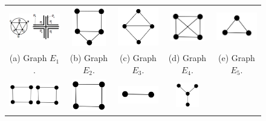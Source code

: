 \documentclass{dmgt}
\begin{document}
%
 \begin{figure}[htb]	
 
   \centering
  \begin{tabular}{  c c c c  c}
    \includegraphics[width=3cm]{octaedro.png} 
    & 
    \includegraphics[width=1.5cm]{ex3.png} 
    & 
    \includegraphics[width=2cm]{diamondNoLabel.png} 
    & 
    \includegraphics[width=1.5cm]{k4.png} 
    & 
    \includegraphics[width=2cm]{k3.png} 
    \\
    \footnotesize 
    (a)  \footnotesize Graph $E_1$. 
    & 
    \footnotesize (b) Graph $E_2$.
    & 
    \footnotesize (c) Graph $E_3$.
    & 
    \footnotesize (d) Graph $E_4$.
    & 
    \footnotesize (e) Graph $E_5$.
    \\%
        \includegraphics[width=2.5cm]{2c4.png} 
    & 
    \includegraphics[width=1.5cm]{c4e.png} 
    & 
    \includegraphics[width=1.8cm]{k2.png} 
    & 
    \includegraphics[width=1cm]{e10.png} 

\end{tabular}
\end{figure}
\end{document}
